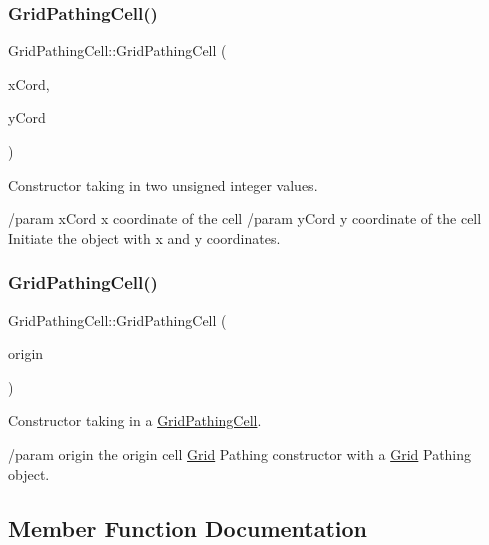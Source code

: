 \subsubsection{\texorpdfstring{Grid\+Pathing\+Cell()}{GridPathingCell()}\hspace{0.1cm}{\footnotesize\ttfamily [1/2]}}
{\footnotesize\ttfamily Grid\+Pathing\+Cell\+::\+Grid\+Pathing\+Cell (\begin{DoxyParamCaption}\item[{uint16}]{x\+Cord,  }\item[{uint16}]{y\+Cord }\end{DoxyParamCaption})}



Constructor taking in two unsigned integer values. 

/param x\+Cord x coordinate of the cell /param y\+Cord y coordinate of the cell Initiate the object with x and y coordinates. \hypertarget{class_grid_pathing_cell_ad249acb6a70659728d0b872a2978fd39}{}\label{class_grid_pathing_cell_ad249acb6a70659728d0b872a2978fd39} 
\subsubsection{\texorpdfstring{Grid\+Pathing\+Cell()}{GridPathingCell()}\hspace{0.1cm}{\footnotesize\ttfamily [2/2]}}
{\footnotesize\ttfamily Grid\+Pathing\+Cell\+::\+Grid\+Pathing\+Cell (\begin{DoxyParamCaption}\item[{const \hyperlink{class_grid_pathing_cell}{Grid\+Pathing\+Cell} \&}]{origin }\end{DoxyParamCaption})}



Constructor taking in a \hyperlink{class_grid_pathing_cell}{Grid\+Pathing\+Cell}. 

/param origin the origin cell \hyperlink{class_grid}{Grid} Pathing constructor with a \hyperlink{class_grid}{Grid} Pathing object. 

\subsection{Member Function Documentation}
\hypertarget{class_grid_pathing_cell_ad188a53ba82a3ee991f57cc3fdd0fb5f}{}\label{class_grid_pathing_cell_ad188a53ba82a3ee991f57cc3fdd0fb5f} 
